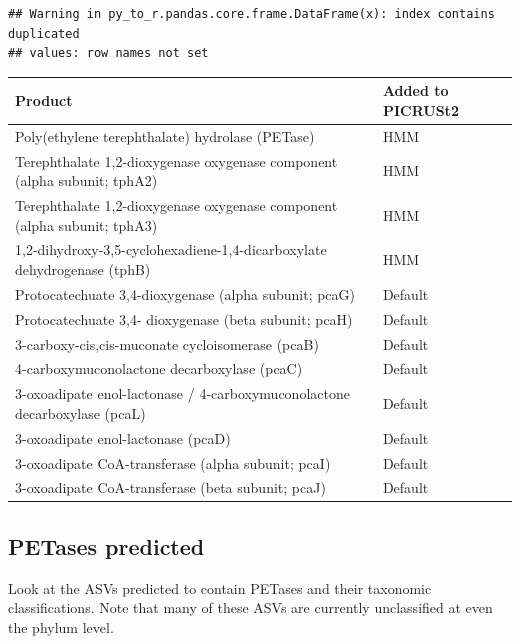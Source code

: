 \documentclass[
]{article}
\begin{document}
\begin{verbatim}
## Warning in py_to_r.pandas.core.frame.DataFrame(x): index contains duplicated
## values: row names not set
\end{verbatim}

\begin{table}[H]
\centering
\begin{tabular}{l|l}
\hline
Product & Added to PICRUSt2\\
\hline
Poly(ethylene terephthalate) hydrolase (PETase) & HMM\\
\hline
Terephthalate 1,2-dioxygenase oxygenase component (alpha subunit; tphA2) & HMM\\
\hline
Terephthalate 1,2-dioxygenase oxygenase component (alpha subunit; tphA3) & HMM\\
\hline
1,2-dihydroxy-3,5-cyclohexadiene-1,4-dicarboxylate dehydrogenase (tphB) & HMM\\
\hline
Protocatechuate 3,4-dioxygenase (alpha subunit; pcaG) & Default\\
\hline
Protocatechuate 3,4- dioxygenase (beta subunit; pcaH) & Default\\
\hline
3-carboxy-cis,cis-muconate cycloisomerase (pcaB) & Default\\
\hline
4-carboxymuconolactone decarboxylase (pcaC) & Default\\
\hline
3-oxoadipate enol-lactonase / 4-carboxymuconolactone decarboxylase (pcaL) & Default\\
\hline
3-oxoadipate enol-lactonase (pcaD) & Default\\
\hline
3-oxoadipate CoA-transferase (alpha subunit; pcaI) & Default\\
\hline
3-oxoadipate CoA-transferase (beta subunit; pcaJ) & Default\\
\hline
\end{tabular}
\end{table}

\hypertarget{petases-predicted}{%
\subsection{PETases predicted}\label{petases-predicted}}

Look at the ASVs predicted to contain PETases and their taxonomic
classifications. Note that many of these ASVs are currently unclassified
at even the phylum level.
\end{document}
